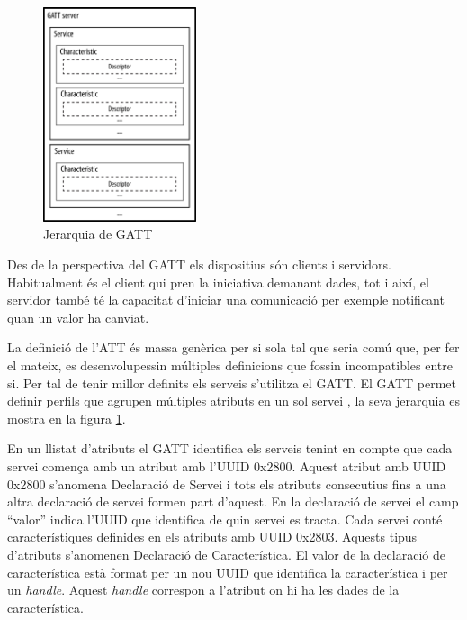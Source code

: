 \begin{figure}[h!]
	\begin{center}
		\includegraphics[width=0.4\textwidth]{./images/GATT_Hierarchy.png}
		\caption{Jerarquia de GATT \cite{GATT_Hierarchy}}
		\label{fig:Gatt_Hierarchy}
	\end{center}
\end{figure}

Des de la perspectiva del GATT els dispositius són clients i servidors.
Habitualment és el client qui pren la iniciativa demanant dades, tot i així, el servidor també té la capacitat d'iniciar una comunicació per exemple notificant quan un valor ha canviat.

La definició de l'ATT és massa genèrica per si sola tal que seria comú que, per fer el mateix, es desenvolupessin múltiples definicions que fossin incompatibles entre si.
Per tal de tenir millor definits els serveis s'utilitza el GATT.
El GATT permet definir perfils que agrupen múltiples atributs en un sol servei \cite{services}, la seva jerarquia es mostra en la figura \ref{fig:Gatt_Hierarchy}.

En un llistat d'atributs el GATT identifica els serveis tenint en compte que cada servei comença amb un atribut amb l'UUID 0x2800.
Aquest atribut amb UUID 0x2800 s'anomena Declaració de Servei i tots els atributs consecutius fins a una altra declaració de servei formen part d'aquest.
En la declaració de servei el camp ``valor'' indica l'UUID que identifica de quin servei es tracta.
Cada servei conté característiques \cite{characteristics} definides en els atributs amb UUID 0x2803.
Aquests tipus d'atributs s'anomenen Declaració de Característica.
El valor de la declaració de característica està format per un nou UUID que identifica la característica i per un \textit{handle}.
Aquest \textit{handle} correspon a l'atribut on hi ha les dades de la característica.

